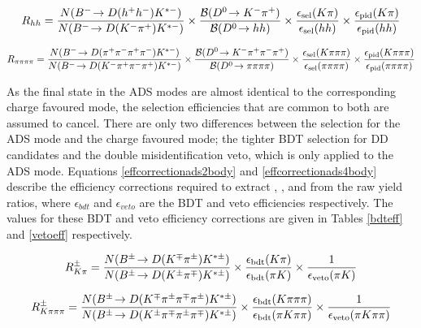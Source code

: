 {\footnotesize
\begin{equation}
R_{hh} = \frac{N({{{B}^-}}\!\rightarrow {\ensuremath{D}}(h^+h^-){{K}^{*-}})}{N({{{B}^-}}\!\rightarrow {\ensuremath{D}}({{K}^-}{{\pi}^+}){{K}^{*-}})} \times \frac{{\mathcal{B}}({{D}^0}\!\rightarrow {\ensuremath{{K}^-}}{\ensuremath{{\pi}^+}})}{{\mathcal{B}}({{D}^0}\!\rightarrow hh)} \times \frac{\epsilon_{\text{sel}}(K\pi)}{\epsilon_{\text{sel}}(hh)} \times \frac{\epsilon_{\text{pid}}(K\pi)}{\epsilon_{\text{pid}}(hh)}
\label{effcorrectionglw2body}
\end{equation}

\begin{equation}
R_{\pi\pi\pi\pi} = \frac{N({{{B}^-}}\!\rightarrow {\ensuremath{D}}({{\pi}^+}{{\pi}^-}{{\pi}^+}{{\pi}^-}){{K}^{*-}})}{N({{{B}^-}}\!\rightarrow {\ensuremath{D}}({{K}^-}{{\pi}^+}{{\pi}^-}{{\pi}^+}){{K}^{*-}})} \times \frac{{\mathcal{B}}({{D}^0}\!\rightarrow {\ensuremath{{K}^-}}{\ensuremath{{\pi}^+}}{\ensuremath{{\pi}^-}}{\ensuremath{{\pi}^+}})}{{\mathcal{B}}({{D}^0}\!\rightarrow \pi\pi\pi\pi)} \times \frac{\epsilon_{\text{sel}}(K\pi\pi\pi)}{\epsilon_{\text{sel}}(\pi\pi\pi\pi)} \times \frac{\epsilon_{\text{pid}}(K\pi\pi\pi)}{\epsilon_{\text{pid}}(\pi\pi\pi\pi)} 
\label{effcorrectionglw4body}
\end{equation}}

As the final state in the ADS modes are almost identical to the corresponding charge favoured mode, the selection efficiencies that are common to both are assumed to cancel. There are only two differences between the selection for the ADS mode and the charge favoured mode; the tighter BDT selection for DD candidates and the double misidentification veto, which is only applied to the ADS mode. Equations \ref{effcorrectionads2body} and \ref{effcorrectionads4body} describe the efficiency corrections required to extract \Rptwo, \Rmtwo, \Rpfour and \Rmfour from the raw yield ratios, where $\epsilon_{bdt}$ and $\epsilon_{veto}$ are the BDT and veto efficiencies respectively. The values for these BDT and veto efficiency corrections are given in Tables \ref{bdteff} and \ref{vetoeff} respectively.

{\footnotesize
\begin{equation}
R^{\pm}_{K\pi} = \frac{N({{B}^\pm}\!\rightarrow {\ensuremath{D}}({{K}^\mp}{{\pi}^\pm}){{K}^{*\pm}})}{N({{B}^\pm}\!\rightarrow {\ensuremath{D}}({{K}^\pm}{{\pi}^\mp}){{K}^{*\pm}})} \times \frac{\epsilon_{\text{bdt}}(K\pi)}{\epsilon_{\text{bdt}}(\pi K)} \times \frac{1}{\epsilon_{\text{veto}}(\pi K)}
\label{effcorrectionads2body}
\end{equation}

\begin{equation}
R^{\pm}_{K\pi\pi\pi} = \frac{N({{B}^\pm}\!\rightarrow {\ensuremath{D}}({{K}^\mp}{{\pi}^\pm}{{\pi}^\mp}{{\pi}^\pm}){{K}^{*\pm}})}{N({{B}^\pm}\!\rightarrow {\ensuremath{D}}({{K}^\pm}{{\pi}^\mp}{{\pi}^\pm}{{\pi}^\mp}){{K}^{*\pm}})} \times \frac{\epsilon_{\text{bdt}}(K\pi\pi\pi)}{\epsilon_{\text{bdt}}(\pi K\pi\pi)} \times \frac{1}{\epsilon_{\text{veto}}(\pi K\pi\pi)}
\label{effcorrectionads4body}
\end{equation}}

